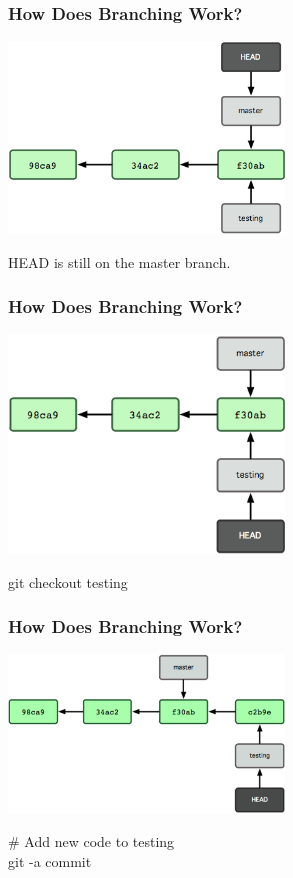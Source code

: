 \begin{frame}
\frametitle{\large How Does Branching Work?}
\begin{center}
\includegraphics[width=0.55\textwidth]{img/branching_images/fig5.png}
\end{center}
\vspace{2mm}
\begin{center}
HEAD is still on the master branch.
\end{center}
\end{frame}
\note{}

\begin{frame}
\frametitle{\large How Does Branching Work?}
\begin{center}
\includegraphics[width=0.55\textwidth]{img/branching_images/fig6.png}
\end{center}
\vspace{2mm}
\begin{center}
git checkout testing
\end{center}
\end{frame}
\note{}

\begin{frame}
\frametitle{\large How Does Branching Work?}
\begin{center}
\includegraphics[width=0.55\textwidth]{img/branching_images/fig7.png}
\end{center}
\vspace{2mm}
\begin{center}
\# Add new code to testing\\
git -a commit
\end{center}
\end{frame}
\note{}

